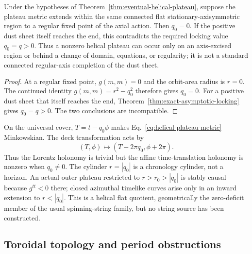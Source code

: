 \begin{corollary}
\label{cor:helical-regular-axis-exclusion}
Under the hypotheses of Theorem~\ref{thm:eventual-helical-plateau}, suppose
the plateau metric extends within the same connected flat
stationary-axisymmetric region to a regular fixed point of the axial action.
Then $q_0=0$. If the positive dust sheet itself reaches the end, this
contradicts the required locking value $q_0=q>0$. Thus a nonzero helical
plateau can occur only on an axis-excised region or behind a change of
domain, equations, or regularity; it is not a standard connected
regular-axis completion of the dust sheet.
\end{corollary}

\begin{proof}
At a regular fixed point, $g(m,m)=0$ and the orbit-area radius is $r=0$.
The continued identity
$g(m,m)=r^2-q_0^2$ therefore gives $q_0=0$. For a positive dust sheet that
itself reaches the end, Theorem~\ref{thm:exact-asymptotic-locking} gives
$q_0=q>0$. The two conclusions are incompatible.
\end{proof}

On the universal cover, $T=t-q_0\phi$ makes
Eq.~\eqref{eq:helical-plateau-metric} Minkowskian. The deck transformation
acts by
$$
(T,\phi)\longmapsto(T-2\pi q_0,\phi+2\pi).
$$
Thus the Lorentz holonomy is trivial but the affine time-translation
holonomy is nonzero when $q_0\neq0$. The cylinder $r=|q_0|$ is a chronology
cylinder, not a horizon. An actual outer plateau restricted to
$r>r_0>|q_0|$ is stably causal because $g^{tt}<0$ there; closed azimuthal
timelike curves arise only in an inward extension to $r<|q_0|$. This is a
helical flat quotient, geometrically the zero-deficit member of the usual
spinning-string family, but no string source has been constructed.

\subsection{Toroidal topology and period obstructions}

